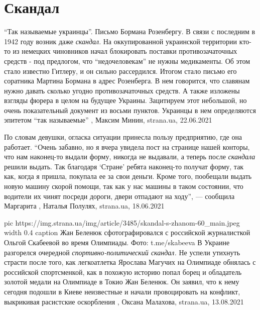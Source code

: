  
 
 
 
 
\chapter{Скандал}
\label{sec:slova.skandal}

\enquote{Так называемые украинцы}. Письмо Бормана Розенбергу.  В связи с последним в
1942 году возник даже \emph{скандал}. На оккупированной украинской территории кто-то
из немецких чиновников начал блокировать поставки противозачаточных средств -
под предлогом, что \enquote{недочеловекам} не нужны медикаменты.  Об этом стало
известно Гитлеру, и он сильно рассердился. Итогом стало письмо его соратника
Мартина Бормана в адрес Розенберга. В нем говорится, что славянам нужно давать
сколько угодно противозачаточных средств. А также изложены взгляды фюрера в
целом на будущее Украины.  Зацитируем этот небольшой, но очень показательный
документ из восьми пунктов. Украинцы в нем определяются эпитетом \enquote{так
называемые}
  , Максим Минин, strana.ua, 22.06.2021

По словам девушки, огласка ситуации принесла пользу предприятию, где она
работает.  \enquote{Очень забавно, но я вчера увидела пост на странице нашей конторы,
что нам наконец-то выдали форму, никогда не выдавали, а теперь после \emph{скандала}
решили выдать. Так благодаря \enquote{Стране} ребята наконец-то получат форму, так как,
когда я пришла, покупала ее за свои деньги. Кроме того, пообещали выдать новую
машину скорой помощи, так как у нас машины в таком состоянии, что водители их
чинят посреди дороги, двери отпадают на ходу}, — сообщила Маргарита
, 
Наталья Полулях, strana.ua, 18.06.2021

\ifcmt
  pic https://img.strana.ua/img/article/3485/skandal-s-zhanom-60_main.jpeg
  width 0.4
	caption Жан Беленюк сфотографировался с российской журналисткой Ольгой Скабеевой во время Олимпиады. Фото: t.me/skabeeva
\fi
В Украине разгорелся очередной \emph{спортивно-политический скандал.} Не успели
утихнуть страсти после того, как легкоатлетка Ярослава Магучих на Олимпиаде
обнялась с российской спортсменкой, как в похожую историю попал борец и
обладатель золотой медали на Олимпиаде в Токио Жан Беленюк.  Он заявил, что к
нему сегодня подошли в Киеве неизвестные и начали провоцировать на конфликт,
выкрикивая расистские оскорбления
, 
Оксана Малахова, strana.ua, 13.08.2021

